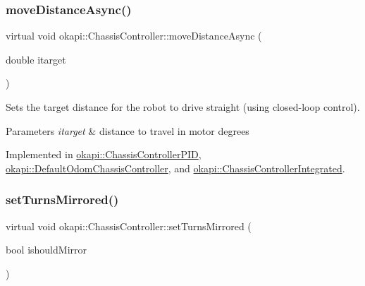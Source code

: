 \mbox{\label{classokapi_1_1ChassisController_a24b46ec1c42f32c0527d57738a07820a}} 
\subsubsection{\texorpdfstring{moveDistanceAsync()}{moveDistanceAsync()}\hspace{0.1cm}{\footnotesize\ttfamily [2/2]}}
{\footnotesize\ttfamily virtual void okapi\+::\+Chassis\+Controller\+::move\+Distance\+Async (\begin{DoxyParamCaption}\item[{double}]{itarget }\end{DoxyParamCaption})\hspace{0.3cm}{\ttfamily [pure virtual]}}

Sets the target distance for the robot to drive straight (using closed-\/loop control).


\begin{DoxyParams}{Parameters}
{\em itarget} & distance to travel in motor degrees \\
\hline
\end{DoxyParams}


Implemented in \mbox{\hyperlink{classokapi_1_1ChassisControllerPID_a7a13b5cd2fe7bce73cf0e3a3144fe6db}{okapi\+::\+Chassis\+Controller\+P\+ID}}, \mbox{\hyperlink{classokapi_1_1DefaultOdomChassisController_ab1abaec33ecce2515895d3a8af363c8c}{okapi\+::\+Default\+Odom\+Chassis\+Controller}}, and \mbox{\hyperlink{classokapi_1_1ChassisControllerIntegrated_ab3cb8eb0c7d5162aafffe8b8ec2751d5}{okapi\+::\+Chassis\+Controller\+Integrated}}.

\mbox{\label{classokapi_1_1ChassisController_a37ae36ec8936272eb31e3baed7eed417}} 
\subsubsection{\texorpdfstring{setTurnsMirrored()}{setTurnsMirrored()}}
{\footnotesize\ttfamily virtual void okapi\+::\+Chassis\+Controller\+::set\+Turns\+Mirrored (\begin{DoxyParamCaption}\item[{bool}]{ishould\+Mirror }\end{DoxyParamCaption})\hspace{0.3cm}{\ttfamily [pure virtual]}}

